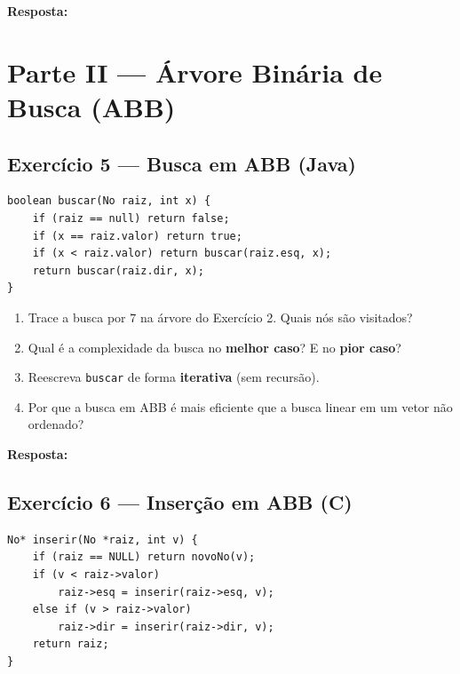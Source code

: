 \documentclass[12pt, a4paper]{article}
\newenvironment{resposta}{%
    \begin{mdframed}[linecolor=black!30, backgroundcolor=white,
                     innertopmargin=10pt, innerbottommargin=30pt,
                     skipabove=6pt]
    \textbf{Resposta:}\\[4pt]
}{%
    \end{mdframed}
}
\begin{document}
\begin{resposta}
\vspace{4cm}
\end{resposta}

\section*{Parte II — Árvore Binária de Busca (ABB)}

\subsection*{Exercício 5 — Busca em ABB (Java)}

\begin{lstlisting}[style=javastyle]
boolean buscar(No raiz, int x) {
    if (raiz == null) return false;
    if (x == raiz.valor) return true;
    if (x < raiz.valor) return buscar(raiz.esq, x);
    return buscar(raiz.dir, x);
}
\end{lstlisting}

\begin{enumerate}[label=(\alph*)]
    \item Trace a busca por $7$ na árvore do Exercício 2. Quais nós são visitados?
    \item Qual é a complexidade da busca no \textbf{melhor caso}? E no \textbf{pior caso}?
    \item Reescreva \texttt{buscar} de forma \textbf{iterativa} (sem recursão).
    \item Por que a busca em ABB é mais eficiente que a busca linear em um vetor não ordenado?
\end{enumerate}

\begin{resposta}
\vspace{4.5cm}
\end{resposta}

\subsection*{Exercício 6 — Inserção em ABB (C)}

\begin{lstlisting}[style=cstyle]
No* inserir(No *raiz, int v) {
    if (raiz == NULL) return novoNo(v);
    if (v < raiz->valor)
        raiz->esq = inserir(raiz->esq, v);
    else if (v > raiz->valor)
        raiz->dir = inserir(raiz->dir, v);
    return raiz;
}
\end{lstlisting}
\end{document}
